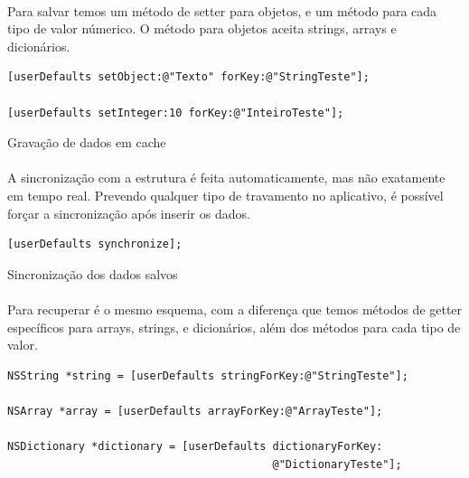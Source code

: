 \documentclass[a4paper,12pt,brazil,doubleside]{book}
\begin{document}
\begin{singlespace}
\paragraph{}Para salvar temos um método de setter para objetos, e um método para cada tipo de valor númerico. O método para objetos aceita strings, arrays e dicionários.

\begin{listing}[H]
\begin{verbatim}
[userDefaults setObject:@"Texto" forKey:@"StringTeste"];

[userDefaults setInteger:10 forKey:@"InteiroTeste"];
\end{verbatim}
\caption{Gravação de dados em cache}
\end{listing}

\paragraph{}A sincronização com a estrutura é feita automaticamente, mas não exatamente em tempo real. Prevendo qualquer tipo de travamento no aplicativo, é possível forçar a sincronização após inserir os dados.

\begin{listing}[H]
\begin{verbatim}
[userDefaults synchronize];
\end{verbatim}
\caption{Sincronização dos dados salvos}
\end{listing}

\paragraph{}Para recuperar é o mesmo esquema, com a diferença que temos métodos de getter específicos para arrays, strings, e dicionários, além dos métodos para cada tipo de valor.

\begin{listing}[H]
\begin{verbatim}
NSString *string = [userDefaults stringForKey:@"StringTeste"];

NSArray *array = [userDefaults arrayForKey:@"ArrayTeste"];

NSDictionary *dictionary = [userDefaults dictionaryForKey:
                                         @"DictionaryTeste"];


\end{verbatim}
\end{listing}
\end{singlespace}
\end{document}

